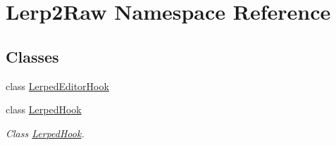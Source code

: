 \hypertarget{namespace_lerp2_raw}{}\section{Lerp2\+Raw Namespace Reference}
\label{namespace_lerp2_raw}
\subsection*{Classes}
\begin{DoxyCompactItemize}
\item 
class \hyperlink{class_lerp2_raw_1_1_lerped_editor_hook}{Lerped\+Editor\+Hook}
\item 
class \hyperlink{class_lerp2_raw_1_1_lerped_hook}{Lerped\+Hook}
\begin{DoxyCompactList}\small\item\em Class \hyperlink{class_lerp2_raw_1_1_lerped_hook}{Lerped\+Hook}. \end{DoxyCompactList}\end{DoxyCompactItemize}

